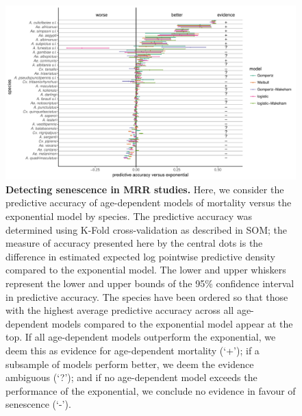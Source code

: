 \documentclass[12pt]{article}
\begin{document}
\begin{figure}[h]
	\centerline{\includegraphics[width=1.3\textwidth]{./Figure_files/mrr_elpd_vs_exponential_ordered.pdf}}
	\caption{\textbf{Detecting senescence in MRR studies.} Here, we consider the predictive accuracy of age-dependent models of mortality versus the exponential model by species. The predictive accuracy was determined using K-Fold cross-validation as described in SOM; the measure of accuracy presented here by the central dots is the difference in estimated expected log pointwise predictive density compared to the exponential model. The lower and upper whiskers represent the lower and upper bounds of the 95\% confidence interval in predictive accuracy. The species have been ordered so that those with the highest average predictive accuracy across all age-dependent models compared to the exponential model appear at the top. If all age-dependent models outperform the exponential, we deem this as evidence for age-dependent mortality (`+'); if a subsample of models perform better, we deem the evidence ambiguous (`?'); and if no age-dependent model exceeds the performance of the exponential, we conclude no evidence in favour of senescence (`-').}
	\label{fig:mrr_elpd}
\end{figure}
\end{document}
